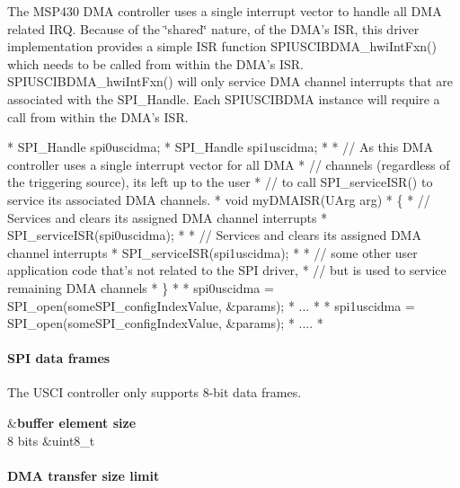 The M\-S\-P430 D\-M\-A controller uses a single interrupt vector to handle all D\-M\-A related I\-R\-Q. Because of the \char`\"{}shared\char`\"{} nature, of the D\-M\-A's I\-S\-R, this driver implementation provides a simple I\-S\-R function S\-P\-I\-U\-S\-C\-I\-B\-D\-M\-A\-\_\-hwi\-Int\-Fxn() which needs to be called from within the D\-M\-A's I\-S\-R. S\-P\-I\-U\-S\-C\-I\-B\-D\-M\-A\-\_\-hwi\-Int\-Fxn() will only service D\-M\-A channel interrupts that are associated with the S\-P\-I\-\_\-\-Handle. Each S\-P\-I\-U\-S\-C\-I\-B\-D\-M\-A instance will require a call from within the D\-M\-A's I\-S\-R.


\begin{DoxyCode}
*  SPI_Handle spi0uscidma;
*  SPI_Handle spi1uscidma;
*
*  \textcolor{comment}{// As this DMA controller uses a single interrupt vector for all DMA}
*  \textcolor{comment}{// channels (regardless of the triggering source), its left up to the user}
*  \textcolor{comment}{// to call SPI\_serviceISR() to service its associated DMA channels.}
*  \textcolor{keywordtype}{void} myDMAISR(UArg arg)
*  \{
*      \textcolor{comment}{// Services and clears its assigned DMA channel interrupts}
*      SPI_serviceISR(spi0uscidma);
*
*      \textcolor{comment}{// Services and clears its assigned DMA channel interrupts}
*      SPI_serviceISR(spi1uscidma);
*
*      \textcolor{comment}{// some other user application code that's not related to the SPI driver,}
*      \textcolor{comment}{// but is used to service remaining DMA channels}
*  \}
*
*  spi0uscidma = SPI_open(someSPI\_configIndexValue, &params);
*  ...
*
*  spi1uscidma = SPI_open(someSPI\_configIndexValue, &params);
*  ....
*  
\end{DoxyCode}


\paragraph*{S\-P\-I data frames}

The U\-S\-C\-I controller only supports 8-\/bit data frames.

\begin{TabularC}{2}
\hline
{}&{\bf buffer element size  }\\
8 bits &uint8\-\_\-t \\
\end{TabularC}
\paragraph*{D\-M\-A transfer size limit}

